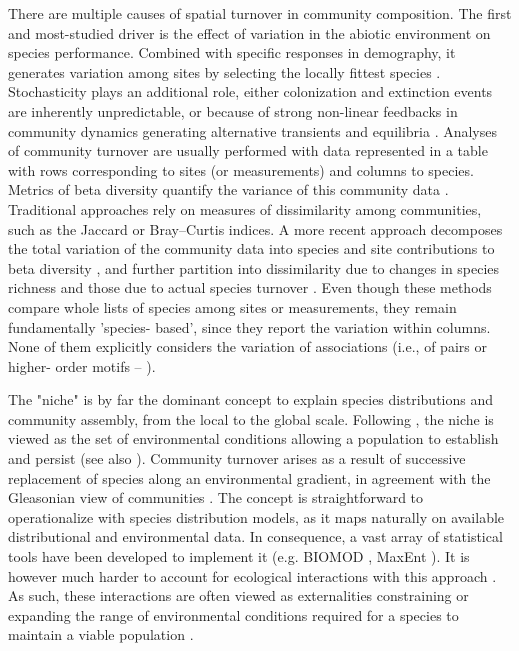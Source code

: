 \documentclass[12pt]{article}
\begin{document}
There are multiple causes of spatial turnover in community composition. The
first and most-studied driver is the effect of variation in the abiotic
environment on species performance. Combined with specific responses in
demography, it generates variation among sites by selecting the locally
fittest species \citep{Leibold2004}. Stochasticity plays an additional role,
either colonization and extinction events \citep{Hanski1999} are inherently
unpredictable, or because of strong non-linear feedbacks in community dynamics
generating alternative transients and equilibria \citep{Chase2007,
Vellend2014}. Analyses of community turnover are usually performed with data
represented in a table with rows corresponding to sites (or measurements) and
columns to species. Metrics of beta diversity quantify the variance of this
community data \citep{Legendre2005}. Traditional approaches rely on measures
of dissimilarity among communities, such as the Jaccard or Bray–Curtis
indices. A more recent approach decomposes the total variation of the
community data into species and site contributions to beta diversity
\citep{Legendre2013}, and further partition into dissimilarity due to changes
in species richness and those due to actual species turnover \citep{Baselga2010;
Carvalho et al. 2012}. Even though these methods compare whole lists of
species among sites or measurements, they remain fundamentally ’species-
based’, since they report the variation within columns. None of them
explicitly considers the variation of associations (i.e., of pairs or higher-
order motifs – \citealt{Stouffer2007}).

The "niche" is by far the dominant concept to explain species distributions
and community assembly, from the local to the global scale. Following
\citealt{Hutchinson1957}, the niche is viewed as the set of environmental
conditions allowing a population to establish and persist (see also
\citealt{Holt2009}). Community turnover arises as a result of successive
replacement of species along an environmental gradient, in agreement with the
Gleasonian view of communities \citep{Gleason1926}. The concept is
straightforward to operationalize with species distribution models, as it maps
naturally on available distributional and environmental data. In consequence,
a vast array of statistical tools have been developed to implement it (e.g.
BIOMOD \citealt{Thuiller2003}, MaxEnt \citealt{Phillips2006}). It is however
much harder to account for ecological interactions with this approach
\citep{Peterson2011}. As such, these interactions are often viewed as externalities
constraining or expanding the range of environmental conditions required for a
species to maintain a viable population \citep{Pulliam2000, Soberon2007, Boulangeat2012}.
\end{document}
